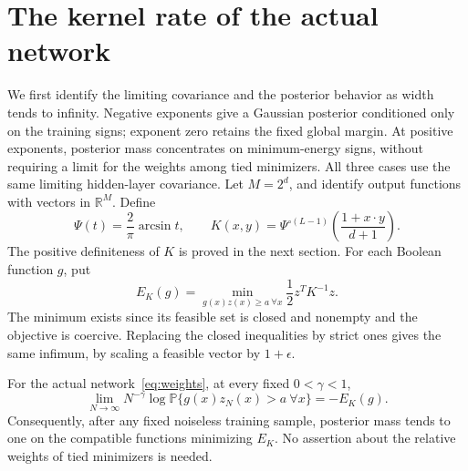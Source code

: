 \section{The kernel rate of the actual network}\label{sec:width-limits}
We first identify the limiting covariance and the posterior behavior as
width tends to infinity. Negative exponents give a Gaussian posterior
conditioned only on the training signs; exponent zero retains the fixed
global margin. At positive exponents, posterior mass concentrates on
minimum-energy signs, without requiring a limit for the weights among
tied minimizers. All three cases use the same limiting hidden-layer
covariance.
Let $M=2^d$, and identify output functions with vectors in $\mathbb R^M$.
Define
\begin{equation}\label{eq:kernel}
 \Psi(t)=\frac2\pi\arcsin t,\qquad
 K(x,y)=\Psi^{\circ(L-1)}\!\left(\frac{1+x\cdot y}{d+1}\right).
\end{equation}
The positive definiteness of $K$ is proved in the next section.
For each Boolean function $g$, put
\begin{equation}\label{eq:energy}
 E_K(g)=\min_{g(x)z(x)\ge a\ \forall x}\frac12 z^TK^{-1}z.
\end{equation}
The minimum exists since its feasible set is closed and nonempty and
the objective is coercive. Replacing the closed inequalities by strict
ones gives the same infimum, by scaling a feasible vector by $1+\epsilon$.

\begin{proposition}
\label{prop:rate}
For the actual network~\eqref{eq:weights}, at every fixed
$0<\gamma<1$,
\begin{equation}\label{eq:rate}
 \lim_{N\to\infty}N^{-\gamma}\log
 \mathbb P\{g(x)z_N(x)>a\ \forall x\}=-E_K(g).
\end{equation}
Consequently, after any fixed noiseless training sample, posterior
mass tends to one on the compatible functions minimizing $E_K$.
No assertion about the relative weights of tied minimizers is needed.
\end{proposition}


